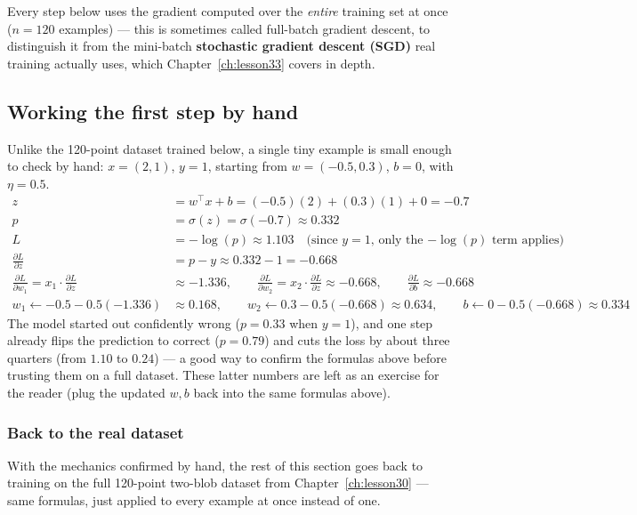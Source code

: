 Every step below uses the gradient computed over the \emph{entire} training set at once ($n=120$ examples) --- this is sometimes called full-batch gradient descent, to distinguish it from the mini-batch \textbf{stochastic gradient descent (SGD)} real training actually uses, which Chapter~\ref{ch:lesson33} covers in depth.

\subsection*{Working the first step by hand}

Unlike the 120-point dataset trained below, a single tiny example is small enough to check by hand: $x=(2,1)$, $y=1$, starting from $w=(-0.5, 0.3)$, $b=0$, with $\eta=0.5$.
\begin{align*}
z &= w^\top x + b = (-0.5)(2) + (0.3)(1) + 0 = -0.7 \\
p &= \sigma(z) = \sigma(-0.7) \approx 0.332 \\
L &= -\log(p) \approx 1.103 \quad\text{(since $y=1$, only the $-\log(p)$ term applies)} \\
\frac{\partial L}{\partial z} &= p - y \approx 0.332 - 1 = -0.668 \\
\frac{\partial L}{\partial w_1} = x_1\cdot\frac{\partial L}{\partial z} &\approx -1.336, \qquad \frac{\partial L}{\partial w_2} = x_2\cdot\frac{\partial L}{\partial z} \approx -0.668, \qquad \frac{\partial L}{\partial b} \approx -0.668 \\
w_1 \leftarrow -0.5 - 0.5(-1.336) &\approx 0.168, \qquad w_2 \leftarrow 0.3 - 0.5(-0.668) \approx 0.634, \qquad b \leftarrow 0 - 0.5(-0.668) \approx 0.334
\end{align*}
The model started out confidently wrong ($p=0.33$ when $y=1$), and one step already flips the prediction to correct ($p=0.79$) and cuts the loss by about three quarters (from $1.10$ to $0.24$) --- a good way to confirm the formulas above before trusting them on a full dataset. These latter numbers are left as an exercise for the reader (plug the updated $w, b$ back into the same formulas above).

\subsubsection*{Back to the real dataset}

With the mechanics confirmed by hand, the rest of this section goes back to training on the full 120-point two-blob dataset from Chapter~\ref{ch:lesson30} --- same formulas, just applied to every example at once instead of one.

